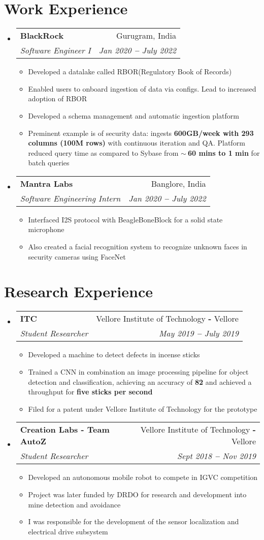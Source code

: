 \documentclass[12pt]{article}
\makeatletter
\newcommand{\resumeItem}[1]{
  \item\small{
    {#1}
  } \vspace{-2pt}
}
\newcommand{\resumeSubheading}[4]{
  \item
    \begin{tabular*}{0.97\textwidth}[t]{l@{\extracolsep{\fill}}r}
      \textbf{\small#1} & \small#2 \\
      \textit{\small#3} & \textit{\small #4} \\
    \end{tabular*}
}
\newcommand{\resumeSubHeadingListStart}{\begin{itemize}[leftmargin=0.15in, label={}]}
\newcommand{\resumeSubHeadingListEnd}{\end{itemize}}
\newcommand{\resumeItemListStart}{\begin{itemize}\vspace{-8pt}}
\newcommand{\resumeItemListEnd}{\end{itemize}\vspace{-8pt}}
\makeatother
\begin{document}
\section{Work Experience}
  \resumeSubHeadingListStart
  \resumeSubheading
      {BlackRock}{Gurugram, India}
      {Software Engineer I}{Jan 2020 \textbf{--} July 2022}
        \resumeItemListStart
            \resumeItem{Developed a datalake called RBOR(Regulatory Book of Records) }
            \resumeItem{Enabled users to onboard ingestion of data via configs. Lead to increased adoption of RBOR}
            \resumeItem{Developed a schema management and automatic ingestion platform}
            \resumeItem{Preminent example is of security data: ingests \textbf{600GB/week with 293 columns (100M rows)} with continuous iteration and QA. Platform reduced query time as compared to Sybase from \textbf{$\sim{~}$60 mins to 1 min} for batch queries}  
        \resumeItemListEnd 
 
      \resumeSubheading
        {Mantra Labs}{Banglore, India}
        {Software Engineering Intern}{Jan 2020 \textbf{--} July 2022}
          \resumeItemListStart
              \resumeItem{Interfaced I2S protocol with BeagleBoneBlock for a solid state microphone}
              \resumeItem{Also created a facial recognition system to recognize unknown faces in security cameras using FaceNet}
          \resumeItemListEnd 
 
    \resumeSubHeadingListEnd
    \vspace{0pt}

\section{Research Experience}
  \resumeSubHeadingListStart
    \resumeSubheading
      {ITC}{ Vellore Institute of Technology  \textbf{-} Vellore}
      {Student Researcher}{May 2019 \textbf{--}  July 2019}
        \resumeItemListStart
            \resumeItem{Developed a machine to detect defects in incense sticks}
            \resumeItem{Trained a CNN in combination an image processing pipeline for object detection and classification, achieving an accuracy of \textbf{82\symbol{\%}} and achieved a throughput for \textbf{five sticks per second} }
            \resumeItem{Filed for a patent under Vellore Institute of Technology for the prototype}
            \resumeItemListEnd
    \resumeSubheading
      {Creation Labs - Team AutoZ}{Vellore Institute of Technology \textbf{-} Vellore}
      {Student Researcher}{Sept 2018 \textbf{--}  Nov 2019}
        \resumeItemListStart
            \resumeItem{Developed an autonomous mobile robot to compete in IGVC competition}
            \resumeItem{Project was later funded by DRDO for research and development into mine detection and avoidance}
            \resumeItem{I was responsible for the development of the sensor localization and electrical drive subsystem}
          \resumeItemListEnd
  \resumeSubHeadingListEnd
    \vspace{0pt}
\end{document}
